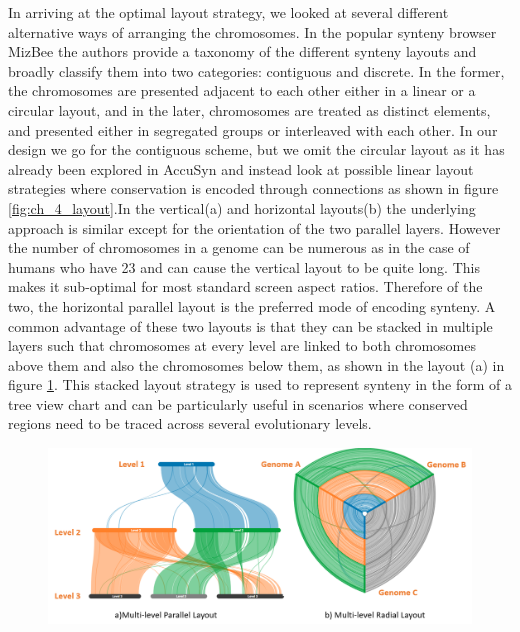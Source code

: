 In arriving at the optimal layout strategy, we looked at several different alternative ways of arranging the chromosomes. In the popular synteny browser MizBee\cite{Meyer2009} the authors provide a taxonomy of the different synteny layouts and broadly classify them into two categories: contiguous and discrete. In the former, the chromosomes are presented adjacent to each other either in a linear or a circular layout, and in the later, chromosomes are treated as distinct elements, and presented either in segregated groups or interleaved with each other. In our design we go for the contiguous scheme, but we omit the circular layout as it has already been explored in AccuSyn\cite{accusyn}  and instead look at possible linear layout strategies where conservation is encoded through connections as shown in figure \ref{fig:ch_4_layout}.In the vertical(a) and horizontal layouts(b) the underlying approach is similar except for the orientation of the two parallel layers. However the number of chromosomes in a genome can be numerous as in the case of humans who have 23 and can cause the vertical layout to be quite long. This makes it sub-optimal for most standard screen aspect ratios. Therefore of the two, the horizontal parallel layout is the preferred mode of encoding synteny. A common advantage of these two layouts is that they can be stacked in multiple layers such that chromosomes at every level are linked to both chromosomes above them and also the chromosomes below them, as shown in the layout (a) in figure \ref{fig:ch_4_layout_multi}. This stacked layout strategy is used to represent synteny in the form of a tree view chart and can be particularly useful in scenarios where conserved regions need to be traced across several evolutionary levels.

\begin{figure}[ht]
  \centering
  \includegraphics[width=.95\linewidth]{images/ch_4_layout_multi.PNG}
  \label{fig:ch_4_layout_multi}
\end{figure}

